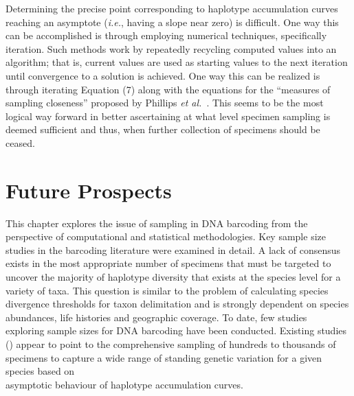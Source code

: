 Determining the precise point corresponding to haplotype accumulation curves \\ reaching an asymptote (\textit{i.e.}, having a slope near zero) is difficult. One way this can be accomplished is through employing numerical techniques, specifically iteration. Such methods work by repeatedly recycling computed values into an algorithm; that is, current values are used as starting values to the next iteration until convergence to a solution is achieved. One way this can be realized is through iterating Equation (7) along with the equations for the ``measures of sampling closeness'' proposed by Phillips \textit{et al.}~\cite{phillips2015exploration}. This seems to be the most logical way forward in better ascertaining at what level specimen sampling is deemed sufficient and thus, when further collection of specimens should be ceased.

\section{Future Prospects}

This chapter explores the issue of sampling in DNA barcoding from the perspective of computational and statistical methodologies. Key sample size studies in the barcoding literature were examined in detail. A lack of consensus exists in the most appropriate number of specimens that must be targeted to uncover the majority of haplotype diversity that exists at the species level for a variety of taxa. This question is similar to the problem of calculating species divergence thresholds for taxon delimitation and is strongly dependent on species abundances, life histories and geographic coverage. To date, few studies \\ exploring sample sizes for DNA barcoding have been conducted. Existing studies (\cite{phillips2015exploration, zhang2010estimating}) appear to point to the comprehensive sampling of hundreds to thousands of specimens to capture a wide range of standing genetic variation for a given species based on \\ asymptotic behaviour of haplotype accumulation curves.

